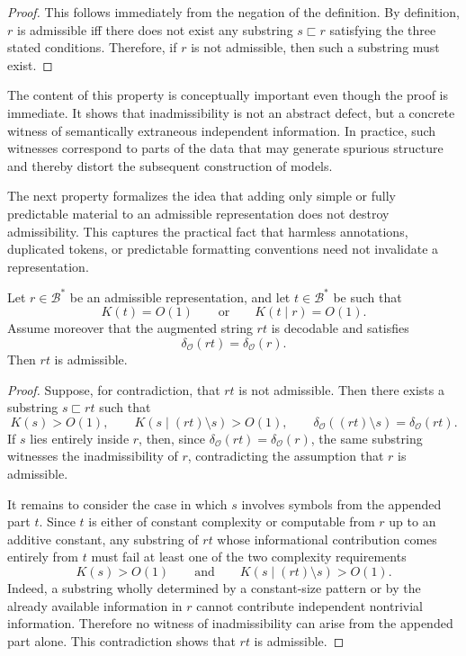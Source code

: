 \begin{proof}
This follows immediately from the negation of the definition. By definition, $r$ is admissible iff there does not exist any substring $s\sqsubset r$ satisfying the three stated conditions. Therefore, if $r$ is not admissible, then such a substring must exist.
\end{proof}

The content of this property is conceptually important even though the proof is immediate. It shows that inadmissibility is not an abstract defect, but a concrete witness of semantically extraneous independent information. In practice, such witnesses correspond to parts of the data that may generate spurious structure and thereby distort the subsequent construction of models.

The next property formalizes the idea that adding only simple or fully predictable material to an admissible representation does not destroy admissibility. This captures the practical fact that harmless annotations, duplicated tokens, or predictable formatting conventions need not invalidate a representation.

\begin{proposition}
Let $r\in\mathcal{B}^\ast$ be an admissible representation, and let $t\in\mathcal{B}^\ast$ be such that
\[
K(t)=O(1)
\qquad\text{or}\qquad
K(t\mid r)=O(1).
\]
Assume moreover that the augmented string $rt$ is decodable and satisfies
\[
\delta_{\mathcal O}(rt)=\delta_{\mathcal O}(r).
\]
Then $rt$ is admissible.
\end{proposition}

\begin{proof}
Suppose, for contradiction, that $rt$ is not admissible. Then there exists a substring $s\sqsubset rt$ such that
\[
K(s)>O(1), \qquad K(s\mid (rt)\setminus s)>O(1), \qquad
\delta_{\mathcal O}((rt)\setminus s)=\delta_{\mathcal O}(rt).
\]
If $s$ lies entirely inside $r$, then, since $\delta_{\mathcal O}(rt)=\delta_{\mathcal O}(r)$, the same substring witnesses the inadmissibility of $r$, contradicting the assumption that $r$ is admissible.

It remains to consider the case in which $s$ involves symbols from the appended part $t$. Since $t$ is either of constant complexity or computable from $r$ up to an additive constant, any substring of $rt$ whose informational contribution comes entirely from $t$ must fail at least one of the two complexity requirements
\[
K(s)>O(1)
\qquad\text{and}\qquad
K(s\mid (rt)\setminus s)>O(1).
\]
Indeed, a substring wholly determined by a constant-size pattern or by the already available information in $r$ cannot contribute independent nontrivial information. Therefore no witness of inadmissibility can arise from the appended part alone. This contradiction shows that $rt$ is admissible.
\end{proof}

